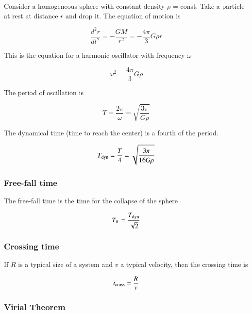 Consider a homogeneous sphere with constant density $\rho$ = const. Take a particle at rest at distance $r$ and drop it. The equation of motion is 

\begin{equation}
\frac{d^2r}{dt^2} = - \frac{GM}{r^2} = - \frac{4\pi}{3}G\rho r
\end{equation}

This is the equation for a harmonic oscillator with frequency $\omega$

\begin{equation}
\omega^2  = \frac{4\pi}{3}G\rho
\end{equation}

The period of oscillation is 

\begin{equation}
T = \frac{2\pi}{\omega}  = \sqrt{\frac{3\pi}{G\rho}}
\end{equation}

The dynamical time (time to reach the center) is a fourth of the period. 


\begin{equation}
T_{\rm dyn}  = \frac{T}{4}  = \sqrt{\frac{3\pi}{16G\rho}}
\end{equation}

\subsubsection{Free-fall time} 

The free-fall time is the time for the collapse of the sphere

\begin{equation}
T_{\rm ff}  = \frac{T_{\rm dyn}}{\sqrt{2}} 
\end{equation}

\subsubsection{Crossing time} 

If $R$ is a typical size of a system and $v$ a typical velocity, then the crossing time is 

\begin{equation}
t_{\rm cross}  = \frac{R}{v} 
\end{equation}

\subsubsection{Virial Theorem}

